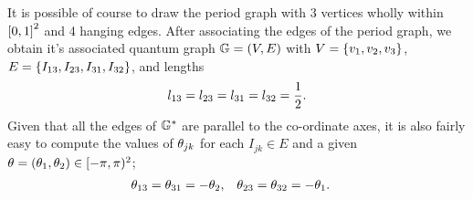 It is possible of course to draw the period graph with 3 vertices wholly within $\left[ 0,1 \right]^2$ and 4 hanging edges.
After associating the edges of the period graph, we obtain it's associated quantum graph $\mathbb{G}=\left( V,E \right)$ with $V=\left\{ v_1,v_2,v_3 \right\}$, $E=\left\{ I_{13},I_{23},I_{31},I_{32} \right\}$, and lengths
\begin{align*}
	l_{13} = l_{23} = l_{31} = l_{32} = \frac{1}{2}.
\end{align*}
Given that all the edges of $\mathbb{G}^*$ are parallel to the co-ordinate axes, it is also fairly easy to compute the values of $\theta_{jk}$ for each $I_{jk}\in E$ and a given $\theta=\left( \theta_1,\theta_2 \right)\in[-\pi,\pi)^2$;
\begin{align*}
	\theta_{13} = \theta_{31} = -\theta_2, &\quad \theta_{23} = \theta_{32} = -\theta_1.
\end{align*}

